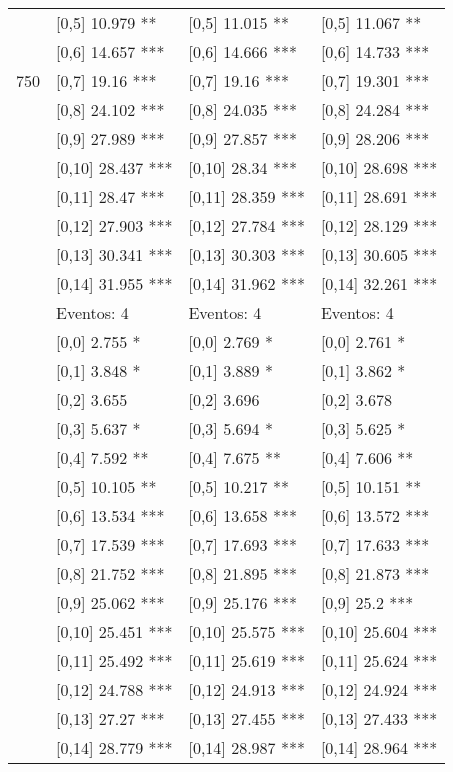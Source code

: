 \begin{table}
\begin{tabular}[t]{llll}
 & {}[0,5] 10.979 ** & {}[0,5] 11.015 ** & {}[0,5] 11.067 **\\
 & {}[0,6] 14.657 *** & {}[0,6] 14.666 *** & {}[0,6] 14.733 ***\\
750 & {}[0,7] 19.16 *** & {}[0,7] 19.16 *** & {}[0,7] 19.301 ***\\
\addlinespace
 & {}[0,8] 24.102 *** & {}[0,8] 24.035 *** & {}[0,8] 24.284 ***\\
 & {}[0,9] 27.989 *** & {}[0,9] 27.857 *** & {}[0,9] 28.206 ***\\
 & {}[0,10] 28.437 *** & {}[0,10] 28.34 *** & {}[0,10] 28.698 ***\\
 & {}[0,11] 28.47 *** & {}[0,11] 28.359 *** & {}[0,11] 28.691 ***\\
 & {}[0,12] 27.903 *** & {}[0,12] 27.784 *** & {}[0,12] 28.129 ***\\
\addlinespace
 & {}[0,13] 30.341 *** & {}[0,13] 30.303 *** & {}[0,13] 30.605 ***\\
 & {}[0,14] 31.955 *** & {}[0,14] 31.962 *** & {}[0,14] 32.261 ***\\
 & Eventos:  4 & Eventos:  4 & Eventos:  4\\
 & {}[0,0] 2.755 * & {}[0,0] 2.769 * & {}[0,0] 2.761 *\\
 & {}[0,1] 3.848 * & {}[0,1] 3.889 * & {}[0,1] 3.862 *\\
\addlinespace
 & {}[0,2] 3.655 & {}[0,2] 3.696 & {}[0,2] 3.678\\
 & {}[0,3] 5.637 * & {}[0,3] 5.694 * & {}[0,3] 5.625 *\\
 & {}[0,4] 7.592 ** & {}[0,4] 7.675 ** & {}[0,4] 7.606 **\\
 & {}[0,5] 10.105 ** & {}[0,5] 10.217 ** & {}[0,5] 10.151 **\\
 & {}[0,6] 13.534 *** & {}[0,6] 13.658 *** & {}[0,6] 13.572 ***\\
\addlinespace
1000 & {}[0,7] 17.539 *** & {}[0,7] 17.693 *** & {}[0,7] 17.633 ***\\
 & {}[0,8] 21.752 *** & {}[0,8] 21.895 *** & {}[0,8] 21.873 ***\\
 & {}[0,9] 25.062 *** & {}[0,9] 25.176 *** & {}[0,9] 25.2 ***\\
 & {}[0,10] 25.451 *** & {}[0,10] 25.575 *** & {}[0,10] 25.604 ***\\
 & {}[0,11] 25.492 *** & {}[0,11] 25.619 *** & {}[0,11] 25.624 ***\\
\addlinespace
 & {}[0,12] 24.788 *** & {}[0,12] 24.913 *** & {}[0,12] 24.924 ***\\
 & {}[0,13] 27.27 *** & {}[0,13] 27.455 *** & {}[0,13] 27.433 ***\\
 & {}[0,14] 28.779 *** & {}[0,14] 28.987 *** & {}[0,14] 28.964 ***\\
\bottomrule
\end{tabular}
\end{table}
